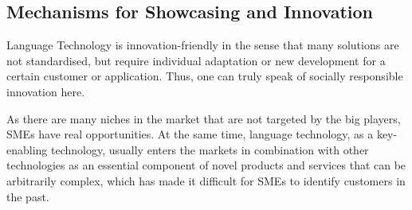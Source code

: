 \documentclass[10pt, plain]{../../metanetpaper}
\begin{document}
\begin{multicols}{2}


\subsection{Mechanisms for Showcasing and Innovation}
\label{sec:powerf-mech-showcasing-and-innovation}


Language Technology is innovation-friendly in the sense that many solutions are not standardised, but require individual adaptation or new development for a certain customer or application. Thus, one can truly speak of socially responsible innovation here.

As there are many niches in the market that are not targeted by the big players, SMEs have real opportunities. At the same time, language technology, as a key-enabling technology, usually enters the markets in combination with other technologies as an essential component of novel products and services that can be arbitrarily complex, which has made it difficult for SMEs to identify customers in the past.


\end{multicols}
\end{document}

